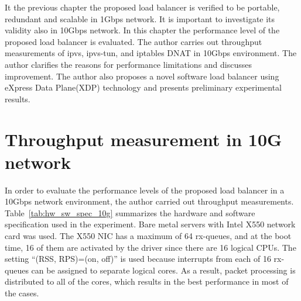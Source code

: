 
It the previous chapter the proposed load balancer is verified to be portable, redundant and scalable in 1Gbps network.
It is important to investigate its validity also in 10Gbps network.
In this chapter the performance level of the proposed load balancer is evaluated.
The author carries out throughput measurements of ipvs, ipvs-tun, and iptables DNAT in 10Gbps environment.
The author clarifies the reasons for performance limitations and discusses improvement.
The author also proposes a novel software load balancer using eXpress Data Plane(XDP) technology and presents preliminary experimental results.

\section{Throughput measurement in 10G network}

In order to evaluate the performance levels of the proposed load balancer in a 10Gbps network environment, the author carried out throughput measurements.
Table~\ref{tab:hw_sw_spec_10g} summarizes the hardware and software specification used in the experiment.
Bare metal servers with Intel X550 network card was used.
The X550 NIC has a maximum of 64 rx-queues, and at the boot time, 16 of them are activated by the driver since there are 16 logical CPUs.
The setting \enquote{(RSS, RPS)=(on, off)} is used because interrupts from each of 16 rx-queues can be assigned to separate logical cores.
As a result, packet processing is distributed to all of the cores, which results in the best performance in most of the cases.

